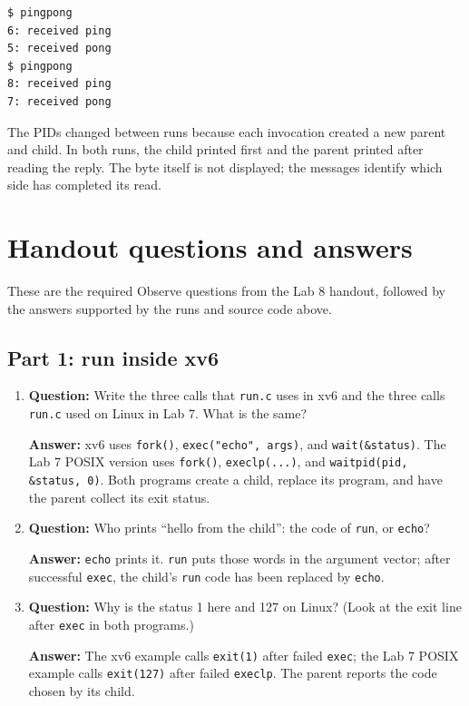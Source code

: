 \documentclass[12pt]{article}
\begin{document}
\begin{lstlisting}
$ pingpong
6: received ping
5: received pong
$ pingpong
8: received ping
7: received pong
\end{lstlisting}

The PIDs changed between runs because each invocation created a new
parent and child. In both runs, the child printed first and the parent
printed after reading the reply. The byte itself is not displayed;
the messages identify which side has completed its read.

\clearpage
\section{Handout questions and answers}
These are the required Observe questions from the Lab 8 handout, followed by
the answers supported by the runs and source code above.

\subsection{Part 1: run inside xv6}
\begin{enumerate}
\item \textbf{Question:} Write the three calls that \texttt{run.c} uses in xv6 and the three calls \texttt{run.c} used on Linux in Lab 7. What is the same?
\par\textbf{Answer:} xv6 uses \texttt{fork()}, \texttt{exec("echo", args)}, and \texttt{wait(\&status)}. The Lab 7 POSIX version uses \texttt{fork()}, \texttt{execlp(...)}, and \texttt{waitpid(pid, \&status, 0)}. Both programs create a child, replace its program, and have the parent collect its exit status.

\item \textbf{Question:} Who prints ``hello from the child'': the code of \texttt{run}, or \texttt{echo}?
\par\textbf{Answer:} \texttt{echo} prints it. \texttt{run} puts those words in the argument vector; after successful \texttt{exec}, the child's \texttt{run} code has been replaced by \texttt{echo}.

\item \textbf{Question:} Why is the status 1 here and 127 on Linux? (Look at the exit line after \texttt{exec} in both programs.)
\par\textbf{Answer:} The xv6 example calls \texttt{exit(1)} after failed \texttt{exec}; the Lab 7 POSIX example calls \texttt{exit(127)} after failed \texttt{execlp}. The parent reports the code chosen by its child.
\end{enumerate}
\end{document}
